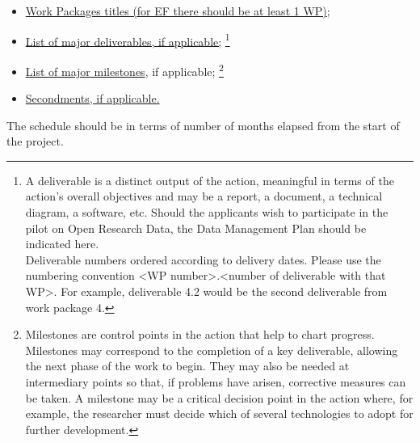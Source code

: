 \begin{itemize}
  \item \ul{Work Packages titles (for EF there should be at least 1 WP)}; 
  \item \ul{List of major deliverables, if applicable;}%
  \footnote{A deliverable is a distinct output of the action, meaningful in terms of the action's overall objectives and may be a report, a document, a technical diagram, a software, etc.
  Should the applicants wish to participate in the pilot on Open Research Data, the Data Management Plan should be indicated here.\\
  Deliverable numbers ordered according to delivery dates. 
  Please use the numbering convention <WP number>.<number of deliverable with that WP>. 
  For example, deliverable 4.2 would be the second deliverable from work package 4.}
  \item \ul{List of major milestones}, if applicable;%
  \footnote{Milestones are control points in the action that help to chart progress. 
  Milestones may correspond to the completion of a key deliverable, allowing the next phase of the work to begin.
  They may also be needed at intermediary points so that, if problems have arisen, corrective measures can be taken. 
  A milestone may be a critical decision point in the action where, for example, the researcher must decide which of several technologies to adopt for further development.}
  \item \ul{Secondments, if applicable.}
\end{itemize}

\noindent
The schedule should be in terms of number of months elapsed from the start of the project.




